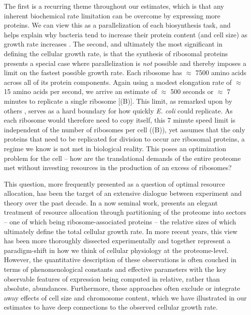The first is a recurring theme throughout our estimates, which is that any
inherent biochemical rate limitation can be overcome by expressing more
proteins. We can view this as a parallelization of each biosynthesis task,
and helps explain why bacteria tend to increase their protein content (and
cell size) as growth rate increases \citep{ojkic2019}. The second, and
ultimately the most significant in defining the cellular growth rate, is that
the synthesis of ribosomal proteins presents a special case where
parallelization is \textit{not} possible and thereby imposes a limit on the
fastest possible growth rate. Each ribosome has $\approx$ 7500 amino acids
across all of its protein components. Again using a modest elongation rate of
$\approx$ 15 amino acids per second, we arrive an estimate of $\approx$ 500
seconds or $\approx$ 7 minutes to replicate a single ribosome [(B)]. This limit, as remarked upon by others
\citep{dill2011}, serves as a hard boundary for how quickly \textit{E. coli}
could replicate. As each ribosome would therefore need to copy itself, this 7
minute speed limit is independent of the number of ribosomes per cell
((B)), yet assumes that the only proteins that need to be 
replicated for division to occur are ribosomal proteins, a regime we know is
not met in biological reality. This poses an optimization problem for the
cell -- how are the translational demands of the entire proteome met without
investing resources in the production of an excess of ribosomes? 

This question, more frequently presented as a question of optimal resource
allocation, has been the target of an extensive dialogue between experiment and
theory over the past decade. In a now seminal work,
\cite{scott2010} presents an elegant treatment of resource allocation through
partitioning of the proteome into sectors -- one of which being
ribosome-associated proteins -- the relative sizes of which ultimately define
the total cellular growth rate. In more recent years, this view has been more
thoroughly dissected experimentally
\citep{klumpp2014,basan2015,dai2018, dai2016, erickson2017} and together
represent a paradigm-shift in how we think of cellular physiology at the
proteome-level. However, the quantitative description of these  observations is
often couched in terms of phenomenological constants and effective parameters
with the key observable features of expression being computed in relative, rather
than absolute, abundances. Furthermore, these approaches often exclude or
integrate away effects of cell size and chromosome content, which we have
illustrated in our estimates to have deep connections to the observed cellular
growth rate.

